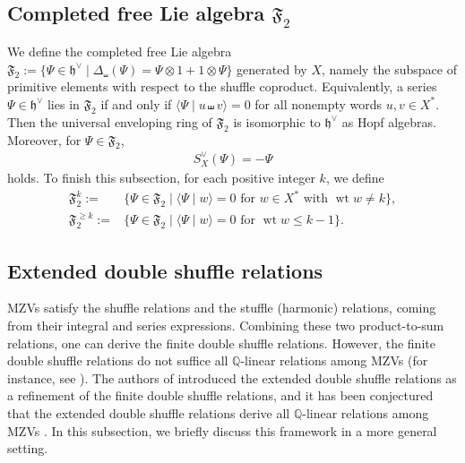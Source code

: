 \documentclass[15pt,oneside,reqno]{amsart}
\theoremstyle{remark}{
\newtheorem{lem}[df]{Lemma}
\newtheorem{prop}[df]{Proposition}
\newtheorem{ex}[df]{Example}
\newtheorem{rmk}[df]{Remark}
}
\newcommand{\ide}[1]{\mathfrak{#1}}
\newcommand{\Q}{\mathbb{Q}}
\DeclareMathOperator{\wt}{wt}
\begin{document}
\subsection{Completed free Lie algebra $\ide{F}_2$}

We define the completed free Lie algebra $\ide{F}_2:= \{\Psi \in \ide{h}^{\vee} \mid \Delta_{\shuffle}(\Psi) = \Psi \otimes 1 + 1 \otimes \Psi\}$ generated by $X$, 
namely the subspace of primitive elements with respect to the shuffle coproduct. Equivalently, a series $\Psi\in\ide{h}^{\vee}$ lies in $\ide{F}_2$ if and only if $\langle \Psi\mid u\shuffle v\rangle=0$ for all nonempty words $u,v\in X^*$.
Then the universal enveloping ring of $\ide{F}_2$ is isomorphic to $\ide{h}^{\vee}$ as Hopf algebras.
Moreover, for $\Psi \in \ide{F}_2$,
\begin{align}
S_X^{\vee}(\Psi) = - \Psi \label{eq:antipode-X}
\end{align}
holds.
To finish this subsection, for each positive integer $k$, we define
\begin{align*}
\ide{F}_2^{k} :=& \{\Psi \in \ide{F}_2 \mid\langle \Psi  \mid w \rangle = 0\text{ for $w\in X^*$ with $\wt w\neq k$}\}, \\
\ide{F}_2^{\ge k} :=& \{ \Psi \in \ide{F}_2 \mid \langle \Psi \mid w \rangle = 0\text{ for } \wt w \le k-1   \}.
\end{align*}




\subsection{Extended double shuffle relations}


MZVs satisfy the shuffle relations and the stuffle (harmonic) relations, coming from their integral and series expressions.
Combining these two product-to-sum relations, one can derive the finite double shuffle relations. 
However, 
the finite double shuffle relations do not suffice all $\Q$-linear relations among MZVs (for instance, see \cite[pp.7]{Ihara-Kaneko-Zagier}).
The authors of \cite{Ihara-Kaneko-Zagier} introduced the extended double shuffle relations as a refinement of the finite double shuffle relations, and it has been conjectured that the extended double shuffle relations derive all $\Q$-linear relations among MZVs \cite[Conjecture 1]{Ihara-Kaneko-Zagier}. In this subsection, we briefly discuss this framework in a more general setting.
\end{document}
